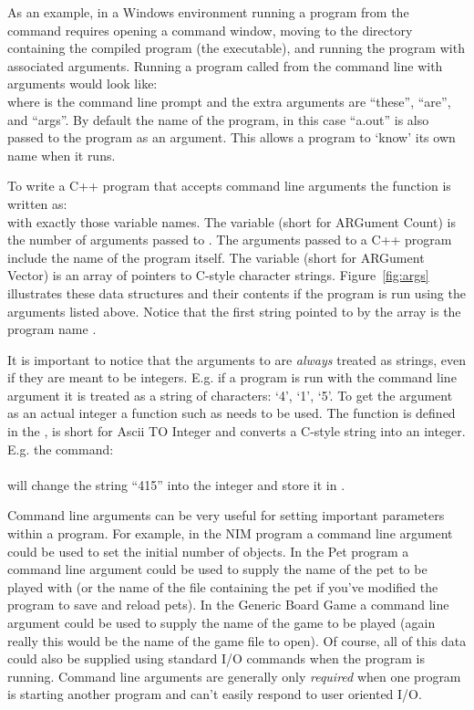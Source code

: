 As an example, in a Windows environment running a program from the command requires opening  a command window, moving to the directory containing the compiled program (the executable), and running the program with associated arguments.  Running a program called  from the command line with arguments would look like:\\
where \codefont{>} is the command line prompt and the extra arguments are ``these'', ``are'', and ``args''.  By default the name of the program, in this case ``a.out'' is also passed to the program as an argument.  This allows a program to `know' its own name when it runs.

To write a C++ program that accepts command line arguments the  function is written as:\\
with exactly those variable names.  The variable  (short for ARGument Count) is the number of arguments passed to .  The arguments passed to a C++ program  include the name of the program itself.  The variable  (short for ARGument Vector) is an array of pointers to C-style character strings.   Figure~\ref{fig:args} illustrates these data structures and their contents if the program is run using the arguments listed above.  Notice that the first string pointed to by the  array is the program name .

It is important to notice that the arguments to  are \emph{always} treated as strings, even if they are meant to be integers.  E.g. if a program is run with the command line argument  it is treated as a string of characters: `4', `1', `5'.  To get the argument as an actual integer a function such as  needs to be used.  The function  is defined in the , is short for Ascii TO Integer and converts a C-style string into an integer.  E.g. the command:\\
\\
will change the string ``415'' into the integer  and store it in .

Command line arguments can be very useful for setting important parameters within a program.  For example, in the NIM program a command line argument could be used to set the initial number of objects.  In the Pet program a command line argument could be used to supply the name of the pet to be played with (or the name of the file containing the pet if you've modified the program to save and reload pets).  In the Generic Board Game a command line argument could be used to supply the name of the game to be played (again really this would be the name of the game file to open).  Of course, all of this data could also be supplied using standard I/O commands when the program is running.  Command line arguments are generally only \emph{required} when one program is starting another program and can't easily respond to user oriented I/O.